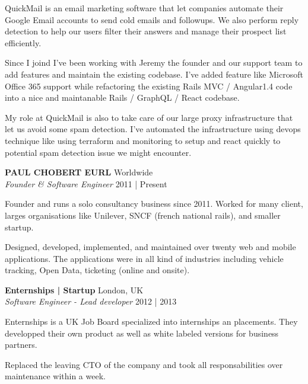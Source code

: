 \documentclass[a4paper]{article}
\begin{document}
QuickMail is an email marketing software that let companies automate their Google Email accounts to send cold emails and followups.
We also perform reply detection to help our users filter their answers and manage their prospect list efficiently.

Since I joind I've been working with Jeremy the founder and our support team
to add features and maintain the existing codebase.
I've added feature like Microsoft Office 365 support while refactoring the existing
Rails MVC / Angular1.4 code into a nice and maintanable Rails / GraphQL / React codebase.

My role at QuickMail is also to take care of our large proxy infrastructure that let us avoid some spam detection.
I've automated the infrastructure using devops technique like using terraform and monitoring to setup and react quickly
to potential spam detection issue we might encounter.


\vspace{2mm}

\textbf{PAUL CHOBERT EURL} \hfill Worldwide\\
\textit{Founder \& Software Engineer} \hfill 2011 | Present\\
\vspace{2mm}

Founder and runs a solo consultancy business since 2011. Worked for many client, larges organisations like Unilever, SNCF (french national rails), and smaller startup.

Designed, developed, implemented, and maintained over twenty web and mobile applications.
The applications were in all kind of industries including vehicle tracking, Open Data, ticketing (online and onsite).

\vspace{2mm}

\textbf{Enternships | Startup} \hfill London, UK\\
\textit{Software Engineer - Lead developer} \hfill 2012 | 2013\\
\vspace{2mm}

\begin{itshape}
Enternships is a UK Job Board specialized into internships an placements.
They developped their own product as well as white labeled versions for business partners.
\end{itshape}

Replaced the leaving CTO of the company and took all responsabilities over maintenance within a week.
\end{document}
